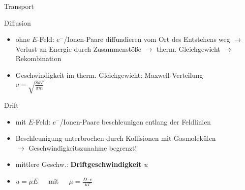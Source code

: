 \begin{frame}{Transport}
	\begin{block}{Diffusion}
	\begin{itemize}
		  \item ohne $E$-Feld: $e^-$/Ionen-Paare diffundieren vom Ort des Entstehens weg $\rightarrow$
		  Verlust an Energie durch Zusammenstöße $\rightarrow$ therm. Gleichgewicht $\rightarrow$
		  Rekombination
		  \item Geschwindigkeit im therm. Gleichgewicht: Maxwell-Verteilung\\
		  		$v=\sqrt{\frac{8kT}{\pi m}}$
		\end{itemize}
	\end{block}
	
	\begin{block}{Drift}
	\begin{itemize}
		  \item mit $E$-Feld: $e^-$/Ionen-Paare beschleunigen entlang der Feldlinien
		  \item Beschleunigung unterbrochen durch Kollisionen mit Gasmolekülen\\
		  		$\rightarrow$ Geschwindigkeitszunahme begrenzt!
		  \item mittlere Geschw.: \bf{Driftgeschwindigkeit $u$}
		  \item $u=\mu E$~~~mit~~~$\mu=\frac{D\cdot e}{kT}$ 
		\end{itemize}
	\end{block}
\end{frame}


